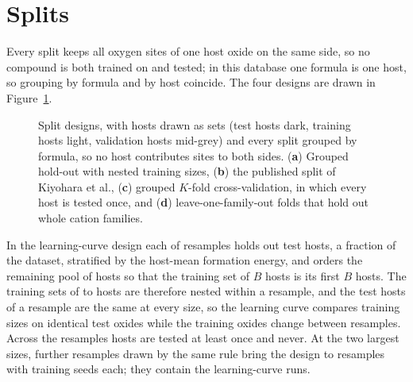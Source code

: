\section{Splits}
\label{app:splits}

Every split keeps all oxygen sites of one host oxide on the same side, so no compound is both trained on and tested; in this database one formula is one host, so grouping by formula and by host coincide. The four designs are drawn in Figure~\ref{fig:app_splits}.

\begin{figure}[H]
\centering
{}
\caption{Split designs, with hosts drawn as sets (test hosts dark, training hosts light, validation hosts mid-grey) and every split grouped by formula, so no host contributes sites to both sides. (\textbf{a}) Grouped hold-out with nested training sizes, (\textbf{b}) the published split of Kiyohara et al., (\textbf{c}) grouped $K$-fold cross-validation, in which every host is tested once, and (\textbf{d}) leave-one-family-out folds that hold out whole cation families.\label{fig:app_splits}}
\end{figure}

In the learning-curve design each of \numCfgSplitNOuterResamples{} resamples holds out \numSplitMetaNTestHosts{} test hosts, a fraction \numSplitMetaTestFraction{} of the dataset, stratified by the host-mean formation energy, and orders the remaining pool of \numSplitMetaPoolSize{} hosts so that the training set of $B$ hosts is its first $B$ hosts. The training sets of \numCfgBudgetsHostsItemOne{} to \numCfgBudgetsHostsItemSix{} hosts are therefore nested within a resample, and the test hosts of a resample are the same at every size, so the learning curve compares training sizes on identical test oxides while the training oxides change between resamples. Across the resamples \numSplitMetaCoverageInTestAtLeastOnce{} hosts are tested at least once and \numSplitMetaCoverageNeverInTest{} never. At the two largest sizes, further resamples drawn by the same rule bring the design to \numPrecisionABFourHundredBSixHundredFiftyFourSubsetsThirtyXFiveNResamples{} resamples with \numPrecisionABFourHundredBSixHundredFiftyFourSubsetsThirtyXFiveNSeeds{} training seeds each; they contain the learning-curve runs.

